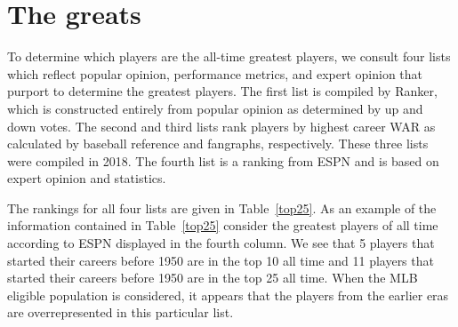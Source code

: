 \documentclass[11pt]{article}\usepackage[]{graphicx}\usepackage[]{color}
\begin{document}
\section{The greats}

To determine which players are the all-time greatest players, we consult four 
lists which reflect popular opinion, performance metrics, and expert opinion 
that purport to determine the greatest players.  The first 
list is compiled by Ranker,  
which is constructed entirely from popular opinion as determined by up and 
down votes.  
The second and third lists rank players by highest career WAR as calculated 
by baseball reference and fangraphs, respectively. 
These three lists were compiled in 2018.  
The fourth list is a ranking from ESPN %
and is based on expert opinion and statistics. %

The rankings for all four lists are given in Table~\ref{top25}.  
As an example of the information contained in Table~\ref{top25} consider 
the greatest players of all time according to ESPN  
displayed in the fourth column.  
We see that 5 players that started their careers before 1950 are in the top 10 
all time and 11 players that started their careers before 1950 are in the top 
25 all time.  When the MLB eligible population is considered, it appears that 
the players from the earlier eras are overrepresented in this particular list.  
\end{document}
